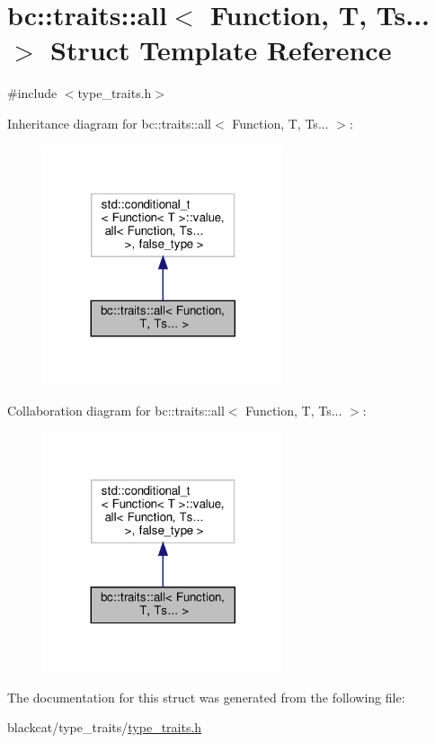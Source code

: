 \hypertarget{structbc_1_1traits_1_1all_3_01Function_00_01T_00_01Ts_8_8_8_01_4}{}\section{bc\+:\+:traits\+:\+:all$<$ Function, T, Ts... $>$ Struct Template Reference}
\label{structbc_1_1traits_1_1all_3_01Function_00_01T_00_01Ts_8_8_8_01_4}


{\ttfamily \#include $<$type\+\_\+traits.\+h$>$}



Inheritance diagram for bc\+:\+:traits\+:\+:all$<$ Function, T, Ts... $>$\+:\nopagebreak
\begin{figure}[H]
\begin{center}
\leavevmode
\includegraphics[width=200pt]{structbc_1_1traits_1_1all_3_01Function_00_01T_00_01Ts_8_8_8_01_4__inherit__graph}
\end{center}
\end{figure}


Collaboration diagram for bc\+:\+:traits\+:\+:all$<$ Function, T, Ts... $>$\+:\nopagebreak
\begin{figure}[H]
\begin{center}
\leavevmode
\includegraphics[width=200pt]{structbc_1_1traits_1_1all_3_01Function_00_01T_00_01Ts_8_8_8_01_4__coll__graph}
\end{center}
\end{figure}


The documentation for this struct was generated from the following file\+:\begin{DoxyCompactItemize}
\item 
blackcat/type\+\_\+traits/\hyperlink{type__traits_2type__traits_8h}{type\+\_\+traits.\+h}\end{DoxyCompactItemize}
